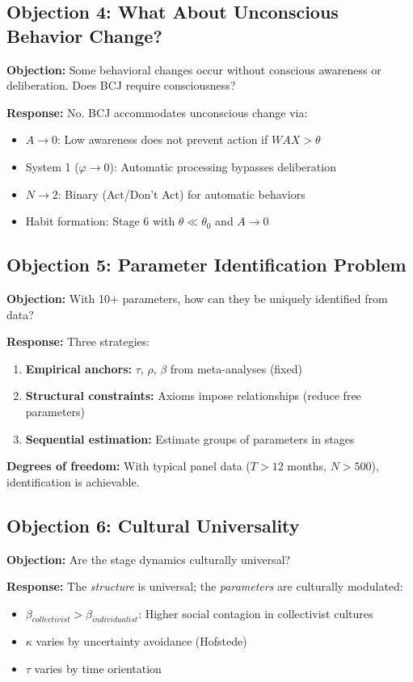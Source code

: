\subsection{Objection 4: What About Unconscious Behavior Change?}

\textbf{Objection:} Some behavioral changes occur without conscious awareness or deliberation. Does BCJ require consciousness?

\textbf{Response:} No. BCJ accommodates unconscious change via:
\begin{itemize}[nosep]
\item $A \to 0$: Low awareness does not prevent action if $WAX > \theta$
\item System 1 ($\varphi \to 0$): Automatic processing bypasses deliberation
\item $N \to 2$: Binary (Act/Don't Act) for automatic behaviors
\item Habit formation: Stage 6 with $\theta \ll \theta_0$ and $A \to 0$
\end{itemize}

\subsection{Objection 5: Parameter Identification Problem}

\textbf{Objection:} With 10+ parameters, how can they be uniquely identified from data?

\textbf{Response:} Three strategies:
\begin{enumerate}[nosep]
\item \textbf{Empirical anchors:} $\tau$, $\rho$, $\beta$ from meta-analyses (fixed)
\item \textbf{Structural constraints:} Axioms impose relationships (reduce free parameters)
\item \textbf{Sequential estimation:} Estimate groups of parameters in stages
\end{enumerate}

\textbf{Degrees of freedom:} With typical panel data ($T > 12$ months, $N > 500$), identification is achievable.

\subsection{Objection 6: Cultural Universality}

\textbf{Objection:} Are the stage dynamics culturally universal?

\textbf{Response:} The \textit{structure} is universal; the \textit{parameters} are culturally modulated:
\begin{itemize}[nosep]
\item $\beta_{collectivist} > \beta_{individualist}$: Higher social contagion in collectivist cultures
\item $\kappa$ varies by uncertainty avoidance (Hofstede)
\item $\tau$ varies by time orientation
\end{itemize}


